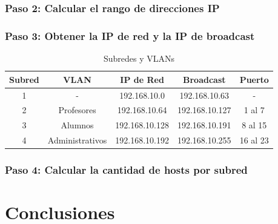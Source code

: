     \subsubsection*{Paso 2: Calcular el rango de direcciones IP}

    \subsubsection*{Paso 3: Obtener la IP de red y la IP de broadcast}

    \begin{table}[H]
        \begin{center}
            \begin{tabular}{ c | c | c | c | c }
                \textbf{Subred} & \textbf{VLAN} & \textbf{IP de Red} & \textbf{Broadcast} & \textbf{Puerto}\\ \hline
                1 & - & 192.168.10.0 & 192.168.10.63 & - \\
                2 & Profesores & 192.168.10.64 & 192.168.10.127 & 1 al 7\\
                3 & Alumnos & 192.168.10.128 & 192.168.10.191 & 8 al 15\\
                4 & Administrativos & 192.168.10.192 & 192.168.10.255 & 16 al 23\\
            \end{tabular}
            \caption{Subredes y VLANs}
            \label{tab:VLANs}
        \end{center}
    \end{table}

    \subsubsection*{Paso 4: Calcular la cantidad de hosts por subred}




\section{Conclusiones}
